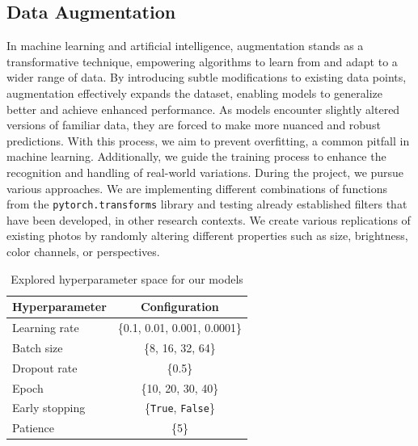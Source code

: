 \subsection{Data Augmentation}
\label{sec:optim:aug}
In machine learning and artificial intelligence, 
augmentation stands as a transformative technique, 
empowering algorithms to learn from and adapt to a wider range of data. 
By introducing subtle modifications to existing data points, 
augmentation effectively expands the dataset, 
enabling models to generalize better and achieve enhanced performance.
As models encounter slightly altered versions of familiar data, 
they are forced to make more nuanced and robust predictions. 
With this process, we aim to prevent overfitting, 
a common pitfall in machine learning. 
Additionally, we guide the training process to enhance the recognition and handling of real-world variations.
During the project, we pursue various approaches. 
We are implementing different combinations of functions from the \texttt{pytorch.transforms} library and testing already established filters that have been developed, in other research contexts. 
We create various replications of existing photos by randomly altering different properties such as size, brightness, color channels, or perspectives.


\begin{table}
  \centering
  \begin{tabular}{@{}lc@{}}
    \toprule
    Hyperparameter & Configuration \\
    \midrule
    Learning rate & \{0.1, 0.01, 0.001, 0.0001\}  \\
    Batch size & \{8, 16, 32, 64\} \\
    Dropout rate & \{0.5\} \\
    Epoch & \{10, 20, 30, 40\} \\
    Early stopping & \{\texttt{True}, \texttt{False}\} \\
    Patience & \{5\} \\
    \bottomrule
  \end{tabular}
  \caption{Explored hyperparameter space for our models}
  \label{tab:hyper}
\end{table}

